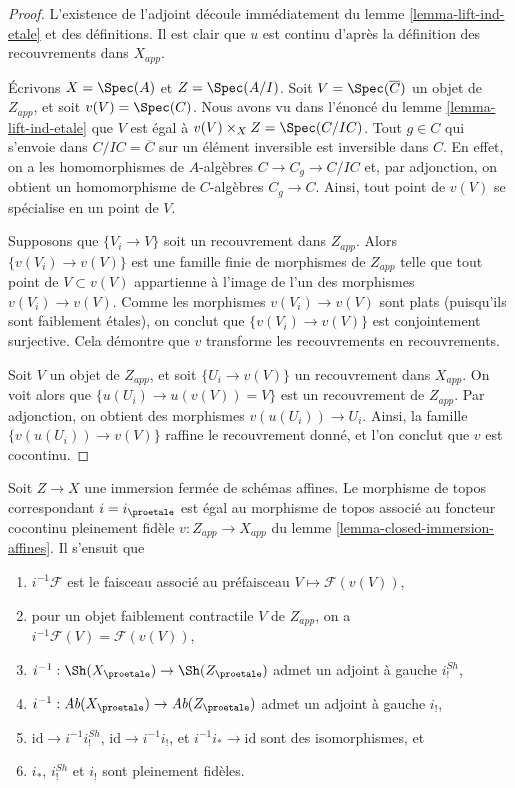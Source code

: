 \begin{proof}
L'existence de l'adjoint découle immédiatement du
lemme \ref{lemma-lift-ind-etale} et des définitions.
Il est clair que $u$ est continu d'après la définition des
recouvrements dans $X_{app}$.

\medskip\noindent
Écrivons $X = \Spec(A)$ et $Z = \Spec(A/I)$. Soit $V = \Spec(\overline{C})$
un objet de $Z_{app}$, et soit $v(V) = \Spec(C)$.
Nous avons vu dans l'énoncé du lemme \ref{lemma-lift-ind-etale}
que $V$ est égal à $v(V) \times_X Z = \Spec(C/IC)$.
Tout $g \in C$ qui s'envoie dans
$C/IC = \overline{C}$ sur un élément inversible est inversible dans $C$. En effet, on a les
homomorphismes de $A$-algèbres $C \to C_g \to C/IC$ et, par adjonction,
on obtient un homomorphisme de $C$-algèbres $C_g \to C$.
Ainsi, tout point de $v(V)$ se spécialise en un point de $V$.

\medskip\noindent
Supposons que $\{V_i \to V\}$ soit un recouvrement dans $Z_{app}$.
Alors $\{v(V_i) \to v(V)\}$ est une famille finie de morphismes de
$Z_{app}$ telle que tout point de $V \subset v(V)$ appartienne
à l'image de l'un des morphismes $v(V_i) \to v(V)$. Comme les
morphismes $v(V_i) \to v(V)$ sont plats (puisqu'ils sont faiblement \'etales),
on conclut que $\{v(V_i) \to v(V)\}$ est conjointement surjective.
Cela démontre que $v$ transforme les recouvrements en recouvrements.

\medskip\noindent
Soit $V$ un objet de $Z_{app}$, et soit $\{U_i \to v(V)\}$
un recouvrement dans $X_{app}$. On voit alors que
$\{u(U_i) \to u(v(V)) = V\}$ est un recouvrement de $Z_{app}$.
Par adjonction, on obtient des morphismes $v(u(U_i)) \to U_i$.
Ainsi, la famille $\{v(u(U_i)) \to v(V)\}$ raffine le
recouvrement donné, et l'on conclut que $v$ est cocontinu.
\end{proof}

\begin{lemma}
\label{lemma-closed-immersion-affines-apply}
Soit $Z \to X$ une immersion fermée de schémas affines.
Le morphisme de topos correspondant $i = i_\proetale$
est égal au morphisme de topos
associé au foncteur cocontinu pleinement fidèle
$v : Z_{app} \to X_{app}$ du lemme \ref{lemma-closed-immersion-affines}.
Il s'ensuit que
\begin{enumerate}
\item $i^{-1}\mathcal{F}$ est le faisceau associé au préfaisceau
$V \mapsto \mathcal{F}(v(V))$,
\item pour un objet faiblement contractile $V$ de $Z_{app}$, on a
$i^{-1}\mathcal{F}(V) = \mathcal{F}(v(V))$,
\item $i^{-1} : \Sh(X_\proetale) \to \Sh(Z_\proetale)$
admet un adjoint à gauche $i^{Sh}_!$,
\item $i^{-1} : \textit{Ab}(X_\proetale) \to \textit{Ab}(Z_\proetale)$
admet un adjoint à gauche $i_!$,
\item $\text{id} \to i^{-1}i^{Sh}_!$, $\text{id} \to i^{-1}i_!$, et
$i^{-1}i_* \to \text{id}$ sont des isomorphismes, et
\item $i_*$, $i^{Sh}_!$ et $i_!$ sont pleinement fidèles.
\end{enumerate}
\end{lemma}

